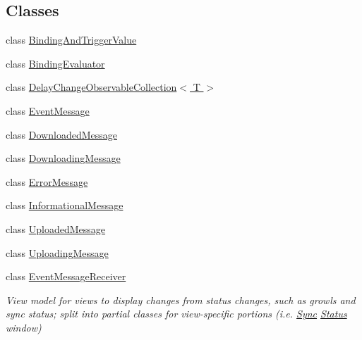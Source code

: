 \subsection*{Classes}
\begin{DoxyCompactItemize}
\item 
class \hyperlink{class_cloud_api_public_1_1_event_message_receiver_1_1_binding_and_trigger_value}{Binding\-And\-Trigger\-Value}
\item 
class \hyperlink{class_cloud_api_public_1_1_event_message_receiver_1_1_binding_evaluator}{Binding\-Evaluator}
\item 
class \hyperlink{class_cloud_api_public_1_1_event_message_receiver_1_1_delay_change_observable_collection_3_01_t_01_4}{Delay\-Change\-Observable\-Collection$<$ T $>$}
\item 
class \hyperlink{class_cloud_api_public_1_1_event_message_receiver_1_1_event_message}{Event\-Message}
\item 
class \hyperlink{class_cloud_api_public_1_1_event_message_receiver_1_1_downloaded_message}{Downloaded\-Message}
\item 
class \hyperlink{class_cloud_api_public_1_1_event_message_receiver_1_1_downloading_message}{Downloading\-Message}
\item 
class \hyperlink{class_cloud_api_public_1_1_event_message_receiver_1_1_error_message}{Error\-Message}
\item 
class \hyperlink{class_cloud_api_public_1_1_event_message_receiver_1_1_informational_message}{Informational\-Message}
\item 
class \hyperlink{class_cloud_api_public_1_1_event_message_receiver_1_1_uploaded_message}{Uploaded\-Message}
\item 
class \hyperlink{class_cloud_api_public_1_1_event_message_receiver_1_1_uploading_message}{Uploading\-Message}
\item 
class \hyperlink{class_cloud_api_public_1_1_event_message_receiver_1_1_event_message_receiver}{Event\-Message\-Receiver}
\begin{DoxyCompactList}\small\item\em View model for views to display changes from status changes, such as growls and sync status; split into partial classes for view-\/specific portions (i.\-e. \hyperlink{namespace_cloud_api_public_1_1_sync}{Sync} \hyperlink{namespace_cloud_api_public_1_1_event_message_receiver_1_1_status}{Status} window) \end{DoxyCompactList}\end{DoxyCompactItemize}
